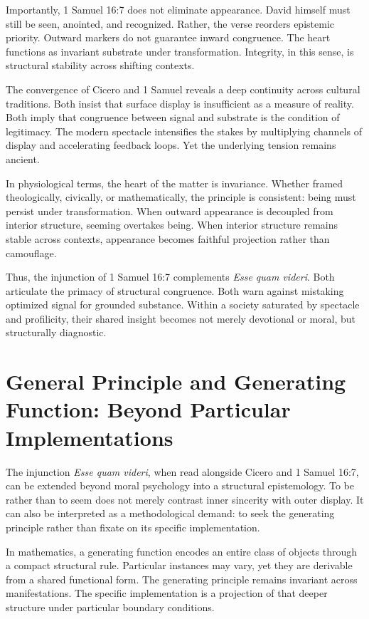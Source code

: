 \documentclass[11pt]{article}
\begin{document}
Importantly, 1 Samuel 16:7 does not eliminate appearance. David himself must still be seen, anointed, and recognized. Rather, the verse reorders epistemic priority. Outward markers do not guarantee inward congruence. The heart functions as invariant substrate under transformation. Integrity, in this sense, is structural stability across shifting contexts.

The convergence of Cicero and 1 Samuel reveals a deep continuity across cultural traditions. Both insist that surface display is insufficient as a measure of reality. Both imply that congruence between signal and substrate is the condition of legitimacy. The modern spectacle intensifies the stakes by multiplying channels of display and accelerating feedback loops. Yet the underlying tension remains ancient.

In physiological terms, the heart of the matter is invariance. Whether framed theologically, civically, or mathematically, the principle is consistent: being must persist under transformation. When outward appearance is decoupled from interior structure, seeming overtakes being. When interior structure remains stable across contexts, appearance becomes faithful projection rather than camouflage.

Thus, the injunction of 1 Samuel 16:7 complements \textit{Esse quam videri}. Both articulate the primacy of structural congruence. Both warn against mistaking optimized signal for grounded substance. Within a society saturated by spectacle and profilicity, their shared insight becomes not merely devotional or moral, but structurally diagnostic.

\section{General Principle and Generating Function: Beyond Particular Implementations}

The injunction \textit{Esse quam videri}, when read alongside Cicero and 1 Samuel 16:7, can be extended beyond moral psychology into a structural epistemology. To be rather than to seem does not merely contrast inner sincerity with outer display. It can also be interpreted as a methodological demand: to seek the generating principle rather than fixate on its specific implementation.

In mathematics, a generating function encodes an entire class of objects through a compact structural rule. Particular instances may vary, yet they are derivable from a shared functional form. The generating principle remains invariant across manifestations. The specific implementation is a projection of that deeper structure under particular boundary conditions.
\end{document}
